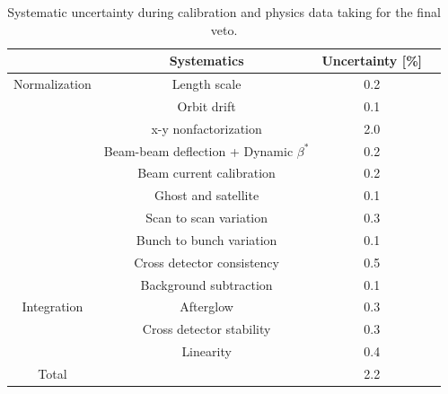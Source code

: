 \begin{table}[htbp]
  \centering
  \caption[2018 Luminosity systematic uncertainty]{Systematic uncertainty during calibration and physics data taking for the final veto.}
\label{tab:systematic-uncertainty}
\begin{tabular}{cccc}
  \textbf{}&\textbf{Systematics} &\textbf{Uncertainty [\%]} \\
\hline
Normalization  & Length scale & 0.2  \\
 & Orbit drift &  0.1  \\
 & x-y nonfactorization & 2.0 \\
 & Beam-beam deflection + Dynamic $\beta^{*}$  & 0.2 \\
 & Beam current calibration  & 0.2 \\
 & Ghost and satellite & 0.1 \\
 & Scan to scan variation & 0.3 \\
 & Bunch to bunch variation & 0.1 \\
 & Cross detector consistency  & 0.5 \\
& Background subtraction  & 0.1 \\
\hline
Integration & Afterglow  &  0.3 \\
 & Cross detector stability & 0.3 \\
& Linearity  & 0.4 \\
\hline
Total &  &  2.2 \\
\end{tabular}
\label{tab:systematic-uncertainty}
\end{table}

